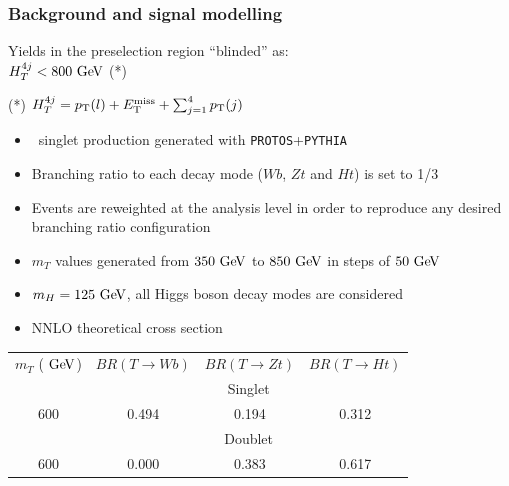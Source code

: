\begin{frame}\frametitle{Background and signal modelling}
\centering\myskip

\begin{minipage}{.5\textwidth}\footnotesize\centering
\scriptsize
Yields in the preselection region ``blinded'' as:\\
$\htfj<800\gev$ (*)
\myskip

  

\myskip
(*) $\htfj = \pT(l) + \met + \sum_{j = 1}^{\rm 4}\pT(j)$
\end{minipage}\begin{minipage}{.5\textwidth}\footnotesize\centering

\begin{itemize}
\item \TTbar\ singlet production generated with {\tt PROTOS}+{\tt PYTHIA}
\item Branching ratio to each decay mode  ($Wb$, $Zt$ and $Ht$) is set to  1/3
\item Events are reweighted at the analysis level in order to reproduce any desired branching ratio configuration
\item $m_{T}$ values generated from $350\gev$ to $850\gev$ in steps of $50\gev$
\item $m_H=125\gev$, all Higgs boson decay modes are considered
\item NNLO theoretical cross section
\end{itemize}

\tiny
\begin{tabular}{c c c c}
\toprule
 $m_{T}$ ($\gev$) & $BR(T \to Wb)$ & $BR(T \to Zt)$ & $BR(T \to Ht)$\\
 & \multicolumn{3}{c}{Singlet} \\
600 	&  0.494 	&  0.194 	&  0.312	\\
\midrule
&  \multicolumn{3}{c}{Doublet} \\
600 	& 0.000 	&  0.383 	&  0.617 	\\ 	
\bottomrule
\end{tabular}

\end{minipage}


\end{frame}


